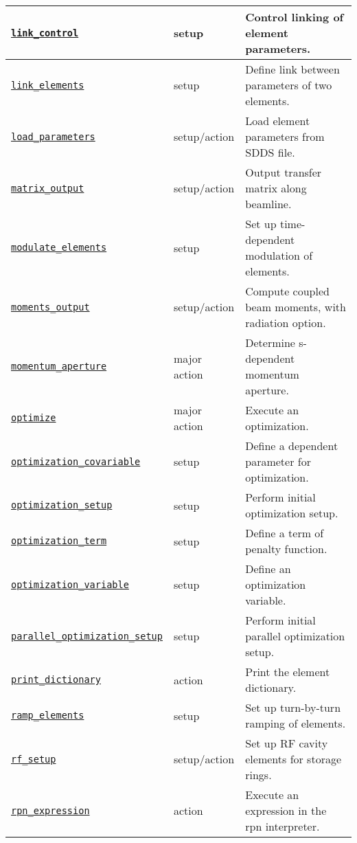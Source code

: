 \documentclass[11pt]{article}
\begin{document}
\begin{longtable}{|p{2.75in}|p{0.75in}|p{2.75in}|}
\hyperref[subsec:linkcontrol]{\tt link\_control} & setup & Control linking of element parameters. \\ \hline
\hyperref[subsec:linkelements]{\tt link\_elements} & setup & Define link between parameters of two elements. \\ \hline
\hyperref[subsec:loadparameters]{\tt load\_parameters} & setup/action & Load element parameters from SDDS file. \\ \hline
\hyperref[subsec:matrixoutput]{\tt matrix\_output} & setup/action & Output transfer matrix along beamline. \\ \hline
\hyperref[subsec:modulateelements]{\tt modulate\_elements} & setup & Set up time-dependent modulation of elements. \\ \hline

\hyperref[subsec:momentsoutput]{\tt moments\_output} & setup/action & Compute coupled beam moments, with radiation option. \\ \hline
\hyperref[subsec:momentumaperture]{\tt momentum\_aperture} & major action & Determine s-dependent momentum aperture. \\ \hline
\hyperref[subsec:optimize]{\tt optimize} & major action & Execute an optimization. \\ \hline
\hyperref[subsec:optimizationcovariable]{\tt optimization\_covariable} & setup & Define a dependent parameter for optimization. \\ \hline
\hyperref[subsec:optimizationsetup]{\tt optimization\_setup} & setup & Perform initial optimization setup. \\ \hline
\hyperref[subsec:optimizationterm]{\tt optimization\_term} & setup & Define a term of penalty function. \\ \hline
\hyperref[subsec:optimizationvariable]{\tt optimization\_variable} & setup & Define an optimization variable. \\ \hline
\hyperref[subsec:paralleloptimizationsetup]{\tt parallel\_optimization\_setup} & setup & Perform initial parallel optimization setup. \\ \hline
\hyperref[subsec:printdictionary]{\tt print\_dictionary} & action & Print the element dictionary. \\ \hline
\hyperref[subsec:rampelements]{\tt ramp\_elements} & setup & Set up turn-by-turn ramping of elements. \\ \hline
\hyperref[subsec:rfsetup]{\tt rf\_setup} & setup/action & Set up RF cavity elements for storage rings. \\ \hline
\hyperref[subsec:rpnexpression]{\tt rpn\_expression} & action & Execute an expression in the rpn interpreter. \\ \hline

\end{longtable}
\end{document}
